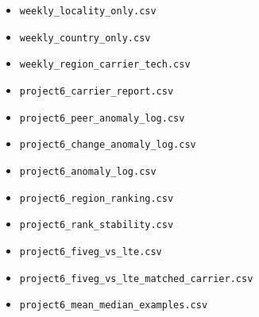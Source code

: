 \documentclass[12pt,a4paper]{article}
\begin{document}
\begin{itemize}
    \item \texttt{weekly\_locality\_only.csv}
    \item \texttt{weekly\_country\_only.csv}
    \item \texttt{weekly\_region\_carrier\_tech.csv}
    \item \texttt{project6\_carrier\_report.csv}
    \item \texttt{project6\_peer\_anomaly\_log.csv}
    \item \texttt{project6\_change\_anomaly\_log.csv}
    \item \texttt{project6\_anomaly\_log.csv}
    \item \texttt{project6\_region\_ranking.csv}
    \item \texttt{project6\_rank\_stability.csv}
    \item \texttt{project6\_fiveg\_vs\_lte.csv}
    \item \texttt{project6\_fiveg\_vs\_lte\_matched\_carrier.csv}
    \item \texttt{project6\_mean\_median\_examples.csv}
\end{itemize}
\end{document}
